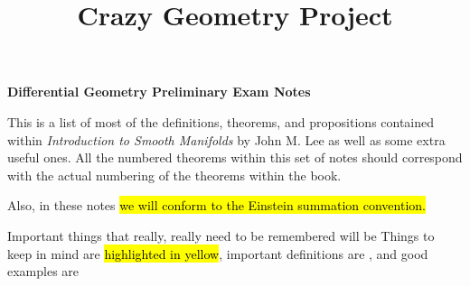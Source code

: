 
\usepackage{color}

\newcommand{\fkgl}{\mathfrak{gl}}
\newcommand{\op}{^{(p)}}
\newcommand{\dfng}{\vs\textbf{\hlg{Definition.}} }
\newcommand{\bgw}{\Lambda}


\title{Crazy Geometry Project}

\newcommand{\wowob}{with or without boundary}



\begin{center}
\textbf{\Large Differential Geometry Preliminary Exam Notes}
\end{center}

This is a list of most of the definitions, theorems, and propositions contained within \textit{Introduction to Smooth Manifolds} by John M. Lee as well as some extra useful ones. All the numbered theorems within this set of notes should correspond with the actual numbering of the theorems within the book.

Also, in these notes \hl{we will conform to the Einstein summation convention.}

Important things that really, really need to be remembered will be  Things to keep in mind are \hl{highlighted in yellow}, important definitions are , and good examples are 

\tableofcontents
\newpage

















